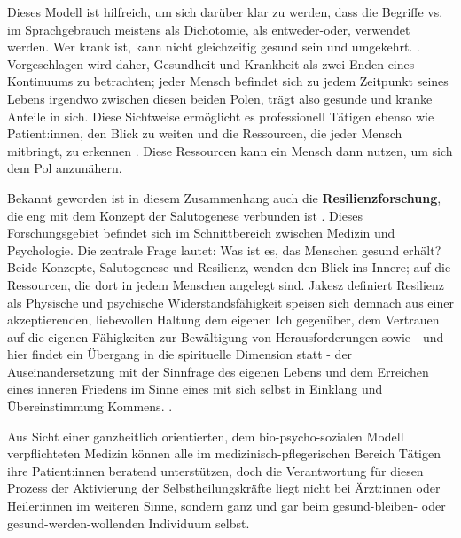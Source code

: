 \documentclass[
  twoside,
  parskip=half-,
  paper=176mm:246mm,
  BCOR=14mm,
  DIV=14,
]{scrreprt}
\begin{document}
Dieses Modell ist hilfreich, um sich darüber klar zu werden, dass die Begriffe  vs.  im Sprachgebrauch meistens als Dichotomie, als entweder-oder, verwendet werden. Wer krank ist, kann nicht gleichzeitig gesund sein und umgekehrt. . Vorgeschlagen wird daher, Gesundheit und Krankheit als zwei Enden eines Kontinuums zu betrachten; jeder Mensch befindet sich zu jedem Zeitpunkt seines Lebens irgendwo zwischen diesen beiden Polen, trägt also gesunde und kranke Anteile in sich. Diese Sichtweise ermöglicht es professionell Tätigen ebenso wie Patient:innen, den Blick zu weiten und die Ressourcen, die jeder Mensch mitbringt, zu erkennen \autocite[17]{knuf}. Diese Ressourcen kann ein Mensch dann nutzen, um sich dem  Pol anzunähern.

Bekannt geworden ist in diesem Zusammenhang auch die \textbf{Resilienzforschung}, die eng mit dem Konzept der Salutogenese verbunden ist \autocite[vgl.][174]{integrativJakesz}. Dieses Forschungsgebiet befindet sich im Schnittbereich zwischen Medizin und Psychologie. Die zentrale Frage lautet: Was ist es, das Menschen gesund erhält? Beide Konzepte, Salutogenese und Resilienz, wenden den Blick ins Innere; auf die Ressourcen, die dort in jedem Menschen angelegt sind. Jakesz definiert Resilienz als  Physische und psychische Widerstandsfähigkeit speisen sich demnach aus einer akzeptierenden, liebevollen Haltung dem eigenen Ich gegenüber, dem Vertrauen auf die eigenen Fähigkeiten zur Bewältigung von Herausforderungen sowie - und hier findet ein Übergang in die spirituelle Dimension statt - der Auseinandersetzung mit der Sinnfrage des eigenen Lebens und dem Erreichen eines inneren Friedens im Sinne eines mit sich selbst in Einklang und Übereinstimmung Kommens. . 

Aus Sicht einer ganzheitlich orientierten, dem bio-psycho-sozialen Modell verpflichteten Medizin können alle im medizinisch-pflegerischen Bereich Tätigen ihre Patient:innen beratend unterstützen, doch die Verantwortung für diesen Prozess der Aktivierung der Selbstheilungskräfte liegt nicht bei Ärzt:innen oder Heiler:innen im weiteren Sinne, sondern ganz und gar beim gesund-bleiben- oder gesund-werden-wollenden Individuum selbst. 
\end{document}
